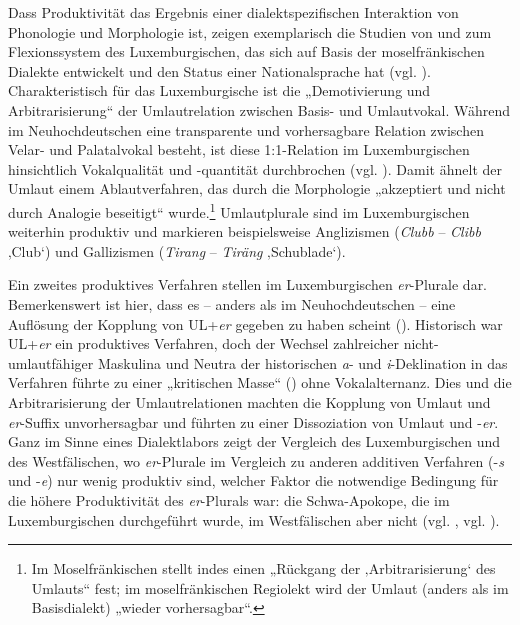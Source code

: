 Dass Produktivität das Ergebnis einer dialektspezifischen Interaktion von Phonologie und Morphologie ist, zeigen exemplarisch die Studien von \citet{Nübling2006} und \citet{DammelDenkler2017} zum Flexionssystem des Luxemburgischen, das sich auf Basis der moselfränkischen Dialekte entwickelt und den Status einer Nationalsprache hat (vgl. \citealt{Gilles2019}). Charakteristisch für das Luxemburgische ist die „Demotivierung und Arbitrarisierung“ \citep[118]{Nübling2006} der Umlautrelation zwischen Basis- und Umlautvokal. Während im Neuhochdeutschen eine transparente und vorhersagbare Relation zwischen Velar- und Palatalvokal besteht, ist diese 1:1-Relation im Luxemburgischen hinsichtlich Vokalqualität und -quantität durchbrochen (vgl. \citealt[116--119]{Nübling2006}). Damit ähnelt der Umlaut einem Ablautverfahren, das durch die Morphologie „akzeptiert und nicht durch Analogie beseitigt“ \citep[119]{Nübling2006} wurde.{\footnote{Im Moselfränkischen stellt \citet[135]{Girnth2006} indes einen „Rückgang der ‚Arbitrarisierung‘ des Umlauts“ fest; im moselfränkischen Regiolekt wird der Umlaut (anders als im Basisdialekt) „wieder vorhersagbar“.}} Umlautplurale sind im Luxemburgischen weiterhin produktiv und markieren beispielsweise Anglizismen (\textit{Clubb} -- \textit{Clibb} ‚Club‘) und Gallizismen (\textit{Tirang} -- \textit{Tiräng} ‚Schublade‘).

Ein zweites produktives Verfahren stellen im Luxemburgischen \textit{er}{}-Plurale dar. Bemerkenswert ist hier, dass es -- anders als im Neuhochdeutschen -- eine Auflösung der Kopplung von UL+\textit{er} gegeben zu haben scheint (\citealt[105]{DammelDenkler2017}). Historisch war UL+\textit{er} ein produktives Verfahren, doch der Wechsel zahlreicher nicht-umlautfähiger Maskulina und Neutra der historischen \textit{a}{}- und \textit{i}{}-Deklination in das Verfahren führte zu einer „kritischen Masse“ (\citealt[107]{DammelDenkler2017}) ohne Vokalalternanz. Dies und die Arbitrarisierung der Umlautrelationen machten die Kopplung von Umlaut und \textit{er}{}-Suffix unvorhersagbar und führten zu einer Dissoziation von Umlaut und -\textit{er}. Ganz im Sinne eines Dialektlabors zeigt der Vergleich des Luxemburgischen und des Westfälischen, wo \textit{er}{}-Plurale im Vergleich zu anderen additiven Verfahren (-\textit{s} und -\textit{e}) nur wenig produktiv sind, welcher Faktor die notwendige Bedingung für die höhere Produktivität des \textit{er}{}-Plurals war: die Schwa-Apokope, die im Luxemburgischen durchgeführt wurde, im Westfälischen aber nicht (vgl. \citealt[108]{DammelDenkler2017}, vgl. \citealt{Dammel2018}).

